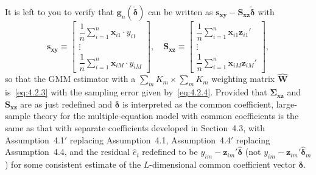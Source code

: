 It is left to you to verify that $\mathbf{g}_n(\tilde{\boldsymbol{\delta}})$
can be written as $\mathbf{s}_{\mathbf{xy}} - \mathbf{S}_{\mathbf{xz}} \tilde{\boldsymbol{\delta}}$ with
\begin{equation}
\mathbf{s}_{\mathbf{xy}}
\equiv \begin{bmatrix}
\dfrac{1}{n} \displaystyle\sum_{i=1}^{n} \mathbf{x}_{i1} \cdot y_{i1} \\[6pt]
\vdots \\[4pt]
\dfrac{1}{n} \displaystyle\sum_{i=1}^{n} \mathbf{x}_{iM} \cdot y_{iM}
\end{bmatrix}, \quad
\mathbf{S}_{\mathbf{xz}}
\equiv \begin{bmatrix}
\dfrac{1}{n} \displaystyle\sum_{i=1}^{n} \mathbf{x}_{i1} \mathbf{z}_{i1}' \\[6pt]
\vdots \\[4pt]
\dfrac{1}{n} \displaystyle\sum_{i=1}^{n} \mathbf{x}_{iM} \mathbf{z}_{iM}'
\end{bmatrix},
\label{eq:4.6.5}
\end{equation}
so that the GMM estimator with a $\sum_m K_m \times \sum_m K_m$ weighting matrix
$\hat{\mathbf{W}}$ is~\eqref{eq:4.2.3} with the sampling error given
by~\eqref{eq:4.2.4}. Provided that $\boldsymbol{\Sigma}_{\mathbf{xz}}$
and $\mathbf{S}_{\mathbf{xz}}$ are as just redefined and $\boldsymbol{\delta}$
is interpreted as the common coefficient, large-sample theory for the
multiple-equation model with common coefficients is the same as that with separate
coefficients developed in Section~4.3, with Assumption~4.1$'$ replacing
Assumption~4.1, Assumption~4.4$'$ replacing Assumption~4.4, and the residual
$\hat{e}_i$ redefined to be $y_{im} - \mathbf{z}_{im}' \hat{\boldsymbol{\delta}}$
(not $y_{im} - \mathbf{z}_{im}' \hat{\boldsymbol{\delta}}_m$) for some consistent
estimate of the $L$-dimensional common coefficient vector $\boldsymbol{\delta}$.

